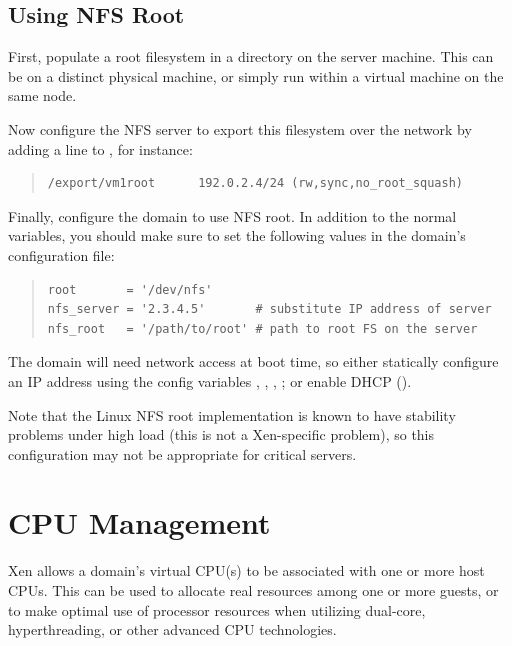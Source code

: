 \documentclass[11pt,twoside,final,openright]{report}
\begin{document}
\section{Using NFS Root}

First, populate a root filesystem in a directory on the server
machine. This can be on a distinct physical machine, or simply run
within a virtual machine on the same node.

Now configure the NFS server to export this filesystem over the
network by adding a line to , for instance:

\begin{quote}
  \begin{small}
\begin{verbatim}
/export/vm1root      192.0.2.4/24 (rw,sync,no_root_squash)
\end{verbatim}
  \end{small}
\end{quote}

Finally, configure the domain to use NFS root.  In addition to the
normal variables, you should make sure to set the following values in
the domain's configuration file:

\begin{quote}
  \begin{small}
\begin{verbatim}
root       = '/dev/nfs'
nfs_server = '2.3.4.5'       # substitute IP address of server
nfs_root   = '/path/to/root' # path to root FS on the server
\end{verbatim}
  \end{small}
\end{quote}

The domain will need network access at boot time, so either statically
configure an IP address using the config variables ,
, , ; or enable DHCP
().

Note that the Linux NFS root implementation is known to have stability
problems under high load (this is not a Xen-specific problem), so this
configuration may not be appropriate for critical servers.


\chapter{CPU Management}


Xen allows a domain's virtual CPU(s) to be associated with one or more
host CPUs.  This can be used to allocate real resources among one or
more guests, or to make optimal use of processor resources when
utilizing dual-core, hyperthreading, or other advanced CPU technologies.
\end{document}
